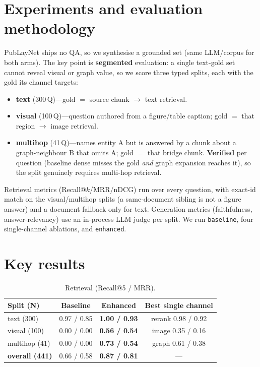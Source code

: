 \documentclass[10pt,oneside,a4paper]{article}
\begin{document}
\section{Experiments and evaluation methodology}

PubLayNet ships no QA, so we synthesise a grounded set (same LLM/corpus for both
arms). The key point is \textbf{segmented} evaluation: a single text-gold set cannot
reveal visual or graph value, so we score three typed splits, each with the gold its
channel targets:
\begin{itemize}
  \item \textbf{text} (300\,Q)---gold $=$ source chunk $\rightarrow$ text retrieval.
  \item \textbf{visual} (100\,Q)---question authored from a figure/table caption;
        gold $=$ that region $\rightarrow$ image retrieval.
  \item \textbf{multihop} (41\,Q)---names entity A but is answered by a chunk about a
        graph-neighbour B that omits A; gold $=$ that bridge chunk. \textbf{Verified}
        per question (baseline dense misses the gold \emph{and} graph expansion
        reaches it), so the split genuinely requires multi-hop retrieval.
\end{itemize}

Retrieval metrics (Recall@$k$/MRR/nDCG) run over every question, with exact-id match
on the visual/multihop splits (a same-document sibling is not a figure answer) and a
document fallback only for text. Generation metrics (faithfulness, answer-relevancy)
use an in-process LLM judge per split. We run \texttt{baseline}, four single-channel
ablations, and \texttt{enhanced}.

\section{Key results}

\begin{table}[h]
  \centering
  \caption{Retrieval (Recall@5 / MRR).}
  \begin{tabular}{lccc}
    \toprule
    Split (N) & Baseline & Enhanced & Best single channel \\
    \midrule
    text (300)              & 0.97 / 0.85 & \textbf{1.00 / 0.93} & rerank 0.98 / 0.92 \\
    visual (100)            & 0.00 / 0.00 & \textbf{0.56 / 0.54} & image 0.35 / 0.16 \\
    multihop (41)           & 0.00 / 0.00 & \textbf{0.73 / 0.54} & graph 0.61 / 0.38 \\
    \textbf{overall (441)}  & 0.66 / 0.58 & \textbf{0.87 / 0.81} & --- \\
    \bottomrule
  \end{tabular}
\end{table}
\end{document}
